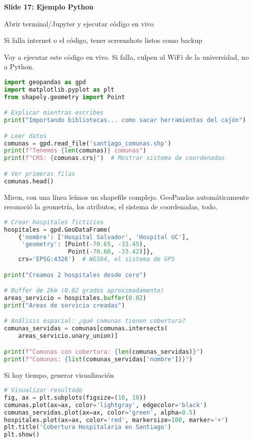 \documentclass[11pt,a4paper]{article}
\newcommand{\decir}[1]{\begin{tcolorbox}[colback=blue!5,colframe=usachblue,title={\faIcon{microphone} DECIR}]#1\end{tcolorbox}}
\newcommand{\hacer}[1]{\begin{tcolorbox}[colback=green!5,colframe=green!50!black,title={\faIcon{hand-point-right} HACER}]#1\end{tcolorbox}}
\newcommand{\nota}[1]{\begin{tcolorbox}[colback=yellow!10,colframe=orange,title={\faIcon{sticky-note} NOTA}]#1\end{tcolorbox}}
\begin{document}
\textbf{Slide 17: Ejemplo Python}

\hacer{Abrir terminal/Jupyter y ejecutar código en vivo}

\nota{Si falla internet o el código, tener screenshots listos como backup}

\decir{Voy a ejecutar este código en vivo. Si falla, culpen al WiFi de la universidad, no a Python.}

\begin{lstlisting}[language=Python, title=Ejecutar línea por línea]
import geopandas as gpd
import matplotlib.pyplot as plt
from shapely.geometry import Point

# Explicar mientras escribes
print("Importando bibliotecas... como sacar herramientas del cajón")

# Leer datos
comunas = gpd.read_file('santiago_comunas.shp')
print(f"Tenemos {len(comunas)} comunas")
print(f"CRS: {comunas.crs}")  # Mostrar sistema de coordenadas

# Ver primeras filas
comunas.head()
\end{lstlisting}

\decir{Miren, con una línea leímos un shapefile complejo. GeoPandas automáticamente reconoció la geometría, los atributos, el sistema de coordenadas, todo.}

\begin{lstlisting}[language=Python, title=Continuar con el análisis]
# Crear hospitales ficticios
hospitales = gpd.GeoDataFrame(
    {'nombre': ['Hospital Salvador', 'Hospital UC'],
     'geometry': [Point(-70.65, -33.45), 
                  Point(-70.60, -33.42)]},
    crs='EPSG:4326')  # WGS84, el sistema de GPS

print("Creamos 2 hospitales desde cero")

# Buffer de 2km (0.02 grados aproximadamente)
areas_servicio = hospitales.buffer(0.02)
print("Areas de servicio creadas")

# Análisis espacial: ¿qué comunas tienen cobertura?
comunas_servidas = comunas[comunas.intersects(
    areas_servicio.unary_union)]

print(f"Comunas con cobertura: {len(comunas_servidas)}")
print(f"Comunas: {list(comunas_servidas['nombre'])}")
\end{lstlisting}

\hacer{Si hay tiempo, generar visualización}

\begin{lstlisting}[language=Python]
# Visualizar resultado
fig, ax = plt.subplots(figsize=(10, 10))
comunas.plot(ax=ax, color='lightgray', edgecolor='black')
comunas_servidas.plot(ax=ax, color='green', alpha=0.5)
hospitales.plot(ax=ax, color='red', markersize=100, marker='+')
plt.title('Cobertura Hospitalaria en Santiago')
plt.show()
\end{lstlisting}
\end{document}

